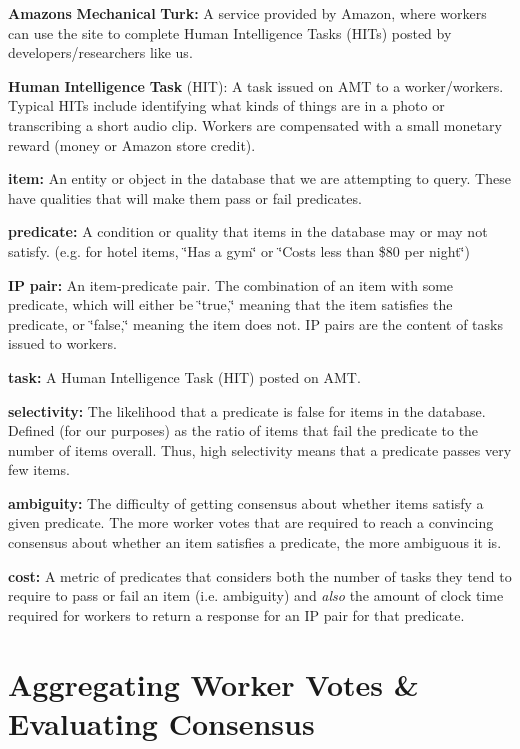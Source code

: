 \begin{DoxyItemize}
\item {\bfseries Amazon\textquotesingle{}s} {\bfseries Mechanical} {\bfseries Turk\+:} A service provided by Amazon, where workers can use the site to complete Human Intelligence Tasks (H\+I\+Ts) posted by developers/researchers like us.
\item {\bfseries Human} {\bfseries Intelligence} {\bfseries Task} {\bfseries }(H\+IT)\+: A task issued on A\+MT to a worker/workers. Typical H\+I\+Ts include identifying what kinds of things are in a photo or transcribing a short audio clip. Workers are compensated with a small monetary reward (money or Amazon store credit).
\item {\bfseries item\+:} An entity or object in the database that we are attempting to query. These have qualities that will make them pass or fail predicates.
\item {\bfseries predicate\+:} A condition or quality that items in the database may or may not satisfy. (e.\+g. for hotel items, \char`\"{}\+Has a gym\char`\"{} or \char`\"{}\+Costs less than \$80 per night\char`\"{})
\item {\bfseries IP} {\bfseries pair\+:} An item-\/predicate pair. The combination of an item with some predicate, which will either be \char`\"{}true,\char`\"{} meaning that the item satisfies the predicate, or \char`\"{}false,\char`\"{} meaning the item does not. IP pairs are the content of tasks issued to workers.
\item {\bfseries task\+:} A Human Intelligence Task (H\+IT) posted on A\+MT.
\item {\bfseries selectivity\+:} The likelihood that a predicate is false for items in the database. Defined (for our purposes) as the ratio of items that fail the predicate to the number of items overall. Thus, high selectivity means that a predicate passes very few items.
\item {\bfseries ambiguity\+:} The difficulty of getting consensus about whether items satisfy a given predicate. The more worker votes that are required to reach a convincing consensus about whether an item satisfies a predicate, the more ambiguous it is.
\item {\bfseries cost\+:} A metric of predicates that considers both the number of tasks they tend to require to pass or fail an item (i.\+e. ambiguity) and {\itshape also} the amount of clock time required for workers to return a response for an IP pair for that predicate.
\end{DoxyItemize}\hypertarget{index_consensus}{}\section{Aggregating Worker Votes \& Evaluating Consensus}\label{index_consensus}
